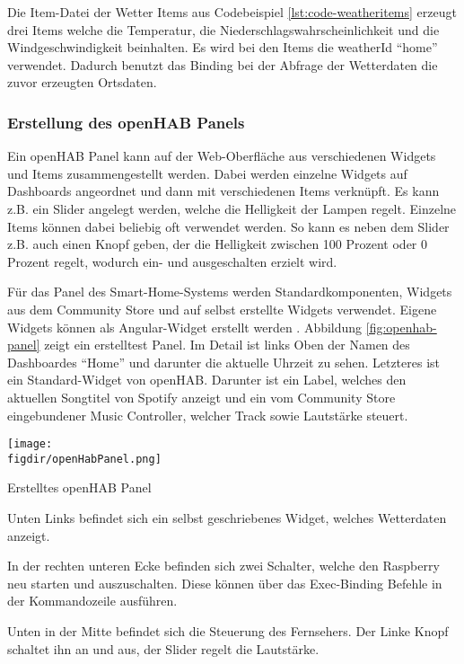 		Die Item-Datei der Wetter Items aus Codebeispiel \ref{lst:code-weatheritems} erzeugt drei Items welche die Temperatur, die Niederschlagswahrscheinlichkeit und die Windgeschwindigkeit beinhalten.
		Es wird bei den Items die weatherId "`home"' verwendet. Dadurch benutzt das Binding bei der Abfrage der Wetterdaten die zuvor erzeugten Ortsdaten.
		
		\subsubsection{Erstellung des openHAB Panels}
		Ein openHAB Panel kann auf der Web-Oberfläche aus verschiedenen Widgets und Items zusammengestellt werden. Dabei werden einzelne Widgets auf Dashboards angeordnet und dann mit verschiedenen Items verknüpft. Es kann z.B. ein Slider angelegt werden, welche die Helligkeit der Lampen regelt. Einzelne Items können dabei beliebig oft verwendet werden. So kann es neben dem Slider z.B. auch einen Knopf geben, der die Helligkeit zwischen 100 Prozent oder 0 Prozent regelt, wodurch ein- und ausgeschalten erzielt wird.
		
		Für das Panel des Smart-Home-Systems werden Standardkomponenten, Widgets aus dem Community Store und auf selbst erstellte Widgets verwendet. Eigene Widgets können als Angular-Widget erstellt werden \cite{DB:widget}.
		Abbildung \ref{fig:openhab-panel} zeigt ein erstelltest Panel. Im Detail ist links Oben der Namen des Dashboardes "`Home"' und darunter die aktuelle Uhrzeit zu sehen. Letzteres ist ein Standard-Widget von openHAB.
		Darunter ist ein Label, welches den aktuellen Songtitel von Spotify anzeigt und ein vom Community Store eingebundener Music Controller, welcher Track sowie Lautstärke steuert.
		\\
		\begin{minipage}{\textwidth}
			\centering
			\captionsetup{type=figure}
			\texttt{[image: \\figdir/openHabPanel.png]}
			\caption{Erstelltes openHAB Panel \label{fig:openhab-panel}}
		\end{minipage}
		\smallskip

		Unten Links befindet sich ein selbst geschriebenes Widget, welches Wetterdaten anzeigt.

		In der rechten unteren Ecke befinden sich zwei Schalter, welche den Raspberry neu starten und auszuschalten. Diese können über das Exec-Binding Befehle in der Kommandozeile ausführen.
		
		Unten in der Mitte befindet sich die Steuerung des Fernsehers. Der Linke Knopf schaltet ihn an und aus, der Slider regelt die Lautstärke.
		

